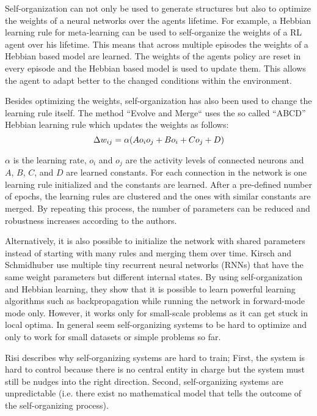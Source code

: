 Self-organization can not only be used to generate structures but also to optimize the weights of a neural networks over the agents lifetime.
For example, a Hebbian learning rule for meta-learning can be used to self-organize the weights of a RL agent over his lifetime.
This means that across multiple episodes the weights of a Hebbian based model are learned.
The weights of the agents policy are reset in every episode and the Hebbian based model is used to update them.
This allows the agent to adapt better to the changed conditions within the environment.

Besides optimizing the weights, self-organization has also been used to change the learning rule itself.
The method ``Evolve and Merge``  uses the so called ``ABCD'' Hebbian learning rule which updates the weights as follows:
\begin{equation}\eqlbl{McCulloch_Pitts_act}
	\Delta w_{ij} = \alpha (A o_i o_j + B o_i + C o_j + D)
\end{equation}%

$\alpha$ is the learning rate, $o_i$ and $o_j$ are the activity levels of connected neurons and $A$, $B$, $C$, and $D$ are learned constants.
For each connection in the network is one learning rule initialized and the constants are learned.
After a pre-defined number of epochs, the learning rules are clustered and the ones with similar constants are merged.
By repeating this process, the number of parameters can be reduced and robustness increases according to the authors.

Alternatively, it is also possible to initialize the network with shared parameters instead of starting with many rules and merging them over time.
Kirsch and Schmidhuber  use multiple tiny recurrent neural networks (RNNs) that have the same weight parameters but different internal states.
By using self-organization and Hebbian learning, they show that it is possible to learn powerful learning algorithms such as backpropagation while running the network in forward-mode mode only.
However, it works only for small-scale problems as it can get stuck in local optima.
In general seem self-organizing systems to be hard to optimize and only to work for small datasets or simple problems so far.

Risi  describes why self-organizing systems are hard to train;
First, the system is hard to control because there is no central entity in charge but the system must still be nudges into the right direction.
Second, self-organizing systems are unpredictable (i.e. there exist no mathematical model that tells the outcome of the self-organizing process).


